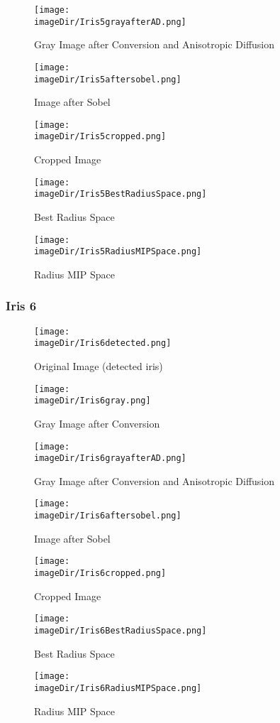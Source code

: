 \documentclass[11pt, a4paper, twoside]{article}   	%
\newcommand{\imageDir}{images}
\begin{document}
\begin{figure}[H]
	\centering
	\texttt{[image: \\imageDir/Iris5grayafterAD.png]}
	\caption{Gray Image after Conversion and Anisotropic Diffusion}
\end{figure}

\begin{figure}[H]
	\centering
	\texttt{[image: \\imageDir/Iris5aftersobel.png]}
	\caption{Image after Sobel}
\end{figure}

\begin{figure}[H]
	\centering
	\texttt{[image: \\imageDir/Iris5cropped.png]}
	\caption{Cropped Image}
\end{figure}

\begin{figure}[H]
	\centering
	\texttt{[image: \\imageDir/Iris5BestRadiusSpace.png]}
	\caption{Best Radius Space}
\end{figure}

\begin{figure}[H]
	\centering
	\texttt{[image: \\imageDir/Iris5RadiusMIPSpace.png]}
	\caption{Radius MIP Space}
\end{figure}

\newpage
\subsubsection{Iris 6}
\begin{figure}[H]
	\centering
	\texttt{[image: \\imageDir/Iris6detected.png]}
	\caption{Original Image (detected iris)}
\end{figure}

\begin{figure}[H]
	\centering
	\texttt{[image: \\imageDir/Iris6gray.png]}
	\caption{Gray Image after Conversion}
\end{figure}

\begin{figure}[H]
	\centering
	\texttt{[image: \\imageDir/Iris6grayafterAD.png]}
	\caption{Gray Image after Conversion and Anisotropic Diffusion}
\end{figure}

\begin{figure}[H]
	\centering
	\texttt{[image: \\imageDir/Iris6aftersobel.png]}
	\caption{Image after Sobel}
\end{figure}

\begin{figure}[H]
	\centering
	\texttt{[image: \\imageDir/Iris6cropped.png]}
	\caption{Cropped Image}
\end{figure}

\begin{figure}[H]
	\centering
	\texttt{[image: \\imageDir/Iris6BestRadiusSpace.png]}
	\caption{Best Radius Space}
\end{figure}

\begin{figure}[H]
	\centering
	\texttt{[image: \\imageDir/Iris6RadiusMIPSpace.png]}
	\caption{Radius MIP Space}
\end{figure}
\end{document}

